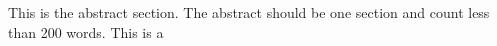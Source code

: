 This is the abstract section. The abstract should be one section and count less than 200 words. This is a 